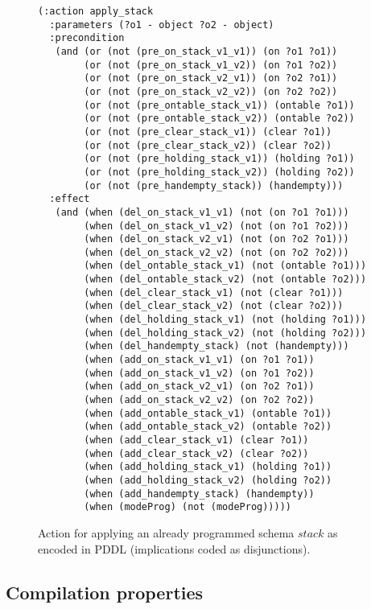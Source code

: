 \documentclass{article}
\begin{document}
\begin{figure}[hbt!]
\begin{scriptsize}
\begin{verbatim}
(:action apply_stack
  :parameters (?o1 - object ?o2 - object)
  :precondition
   (and (or (not (pre_on_stack_v1_v1)) (on ?o1 ?o1))
        (or (not (pre_on_stack_v1_v2)) (on ?o1 ?o2))
        (or (not (pre_on_stack_v2_v1)) (on ?o2 ?o1))
        (or (not (pre_on_stack_v2_v2)) (on ?o2 ?o2))
        (or (not (pre_ontable_stack_v1)) (ontable ?o1))
        (or (not (pre_ontable_stack_v2)) (ontable ?o2))
        (or (not (pre_clear_stack_v1)) (clear ?o1))
        (or (not (pre_clear_stack_v2)) (clear ?o2))
        (or (not (pre_holding_stack_v1)) (holding ?o1))
        (or (not (pre_holding_stack_v2)) (holding ?o2))
        (or (not (pre_handempty_stack)) (handempty)))
  :effect
   (and (when (del_on_stack_v1_v1) (not (on ?o1 ?o1)))
        (when (del_on_stack_v1_v2) (not (on ?o1 ?o2)))
        (when (del_on_stack_v2_v1) (not (on ?o2 ?o1)))
        (when (del_on_stack_v2_v2) (not (on ?o2 ?o2)))
        (when (del_ontable_stack_v1) (not (ontable ?o1)))
        (when (del_ontable_stack_v2) (not (ontable ?o2)))
        (when (del_clear_stack_v1) (not (clear ?o1)))
        (when (del_clear_stack_v2) (not (clear ?o2)))
        (when (del_holding_stack_v1) (not (holding ?o1)))
        (when (del_holding_stack_v2) (not (holding ?o2)))
        (when (del_handempty_stack) (not (handempty)))
        (when (add_on_stack_v1_v1) (on ?o1 ?o1))
        (when (add_on_stack_v1_v2) (on ?o1 ?o2))
        (when (add_on_stack_v2_v1) (on ?o2 ?o1))
        (when (add_on_stack_v2_v2) (on ?o2 ?o2))
        (when (add_ontable_stack_v1) (ontable ?o1))
        (when (add_ontable_stack_v2) (ontable ?o2))
        (when (add_clear_stack_v1) (clear ?o1))
        (when (add_clear_stack_v2) (clear ?o2))
        (when (add_holding_stack_v1) (holding ?o1))
        (when (add_holding_stack_v2) (holding ?o2))
        (when (add_handempty_stack) (handempty))
        (when (modeProg) (not (modeProg)))))
\end{verbatim}
\end{scriptsize}
 \caption{\small Action for applying an already programmed schema $stack$ as encoded in PDDL (implications coded as disjunctions).}
\label{fig:compilation}
\end{figure}


\subsection{Compilation properties}
\end{document}
